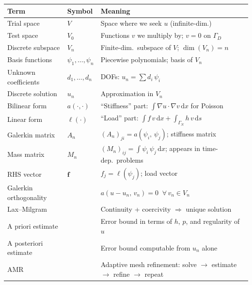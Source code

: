 \documentclass[11pt,a4paper]{article}
\theoremstyle{plain}
\theoremstyle{remark}
\newcommand{\dx}{\,\mathrm{d}x}
\newcommand{\ds}{\,\mathrm{d}s}
\newcommand{\un}{u_n}
\newcommand{\vn}{v_n}
\begin{document}
\renewcommand{\arraystretch}{1.3}
\begin{center}
\begin{tabularx}{\textwidth}{@{}l l X@{}}
  \toprule
  \textbf{Term}
    & \textbf{Symbol}
    & \textbf{Meaning} \\
  \midrule
  Trial space
    & $V$
    & Space where we seek $u$
      (infinite-dim.) \\
  Test space
    & $V_0$
    & Functions $v$ we multiply by;
      $v=0$ on $\Gamma_D$ \\
  Discrete subspace
    & $V_n$
    & Finite-dim.\ subspace of $V$;
      $\dim(V_n) = n$ \\
  Basis functions
    & $\psi_1,\ldots,\psi_n$
    & Piecewise polynomials; basis of $V_n$ \\
  Unknown coefficients
    & $d_1,\ldots,d_n$
    & DOFs: $\un = \sum d_i\,\psi_i$ \\
  Discrete solution
    & $u_n$
    & Approximation in $V_n$ \\
  Bilinear form
    & $a(\cdot,\cdot)$
    & ``Stiffness'' part:
      $\int \nabla u \cdot \nabla v\dx$ for Poisson \\
  Linear form
    & $\ell(\cdot)$
    & ``Load'' part:
      $\int f\,v\dx + \int_{\Gamma_N} h\,v\ds$ \\
  Galerkin matrix
    & $A_n$
    & $(A_n)_{ji} = a(\psi_i,\,\psi_j)$;
      stiffness matrix \\
  Mass matrix
    & $M_n$
    & $(M_n)_{ij} = \int \psi_i\,\psi_j\dx$;
      appears in time-dep.\ problems \\
  RHS vector
    & $\mathbf{f}$
    & $f_j = \ell(\psi_j)$;
      load vector \\
  Galerkin orthogonality
    &
    & $a(u-\un,\,\vn) = 0\;\;\forall\,\vn \in V_n$ \\
  Lax--Milgram
    &
    & Continuity + coercivity
      $\Rightarrow$ unique solution \\
  A priori estimate
    &
    & Error bound in terms of $h$, $p$,
      and regularity of $u$ \\
  A posteriori estimate
    &
    & Error bound computable from $\un$
      alone \\
  AMR
    &
    & Adaptive mesh refinement:
      solve $\to$ estimate $\to$ refine $\to$ repeat \\
  \bottomrule
\end{tabularx}
\end{center}

\newpage
\end{document}
